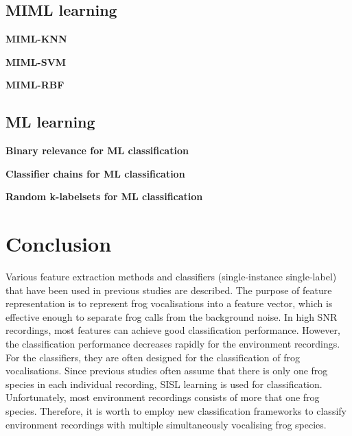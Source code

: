 \subsection{MIML learning}


\textbf{MIML-KNN
}


\textbf{MIML-SVM
}




\textbf{MIML-RBF
}

\subsection{ML learning}

\textbf{Binary relevance for ML classification
}

\textbf{Classifier chains for ML classification
}



\textbf{Random k-labelsets for ML classification
}







\section{Conclusion}
Various feature extraction methods and classifiers (single-instance single-label) that have been used in previous studies are described. The purpose of feature representation is to represent frog vocalisations into a feature vector, which is effective enough to separate frog calls from the background noise. In high SNR recordings, most features can achieve good classification performance. However, the classification performance decreases rapidly for the environment recordings. For the classifiers, they are often designed for the classification of frog vocalisations. Since previous studies often assume that there is only one frog species in each individual recording, SISL learning is used for classification. Unfortunately, most environment recordings consists of more that one frog species. Therefore, it is worth to employ new classification frameworks to classify environment recordings with multiple simultaneously vocalising frog species.



